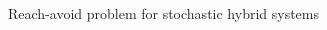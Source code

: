                  \begin{figure}[!t]
                   \begin{center}
                     \begin{subfigmatrix}{2}%
                     \end{subfigmatrix}   
                     \caption{Reach-avoid problem for stochastic hybrid systems}
                     \label{fig:reach_avoid_problem}
                   \end{center}
                 \end{figure}

         

